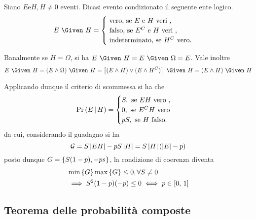 \documentclass{subfiles}
\begin{document}
\begin{Definition*}
    Siano \(E \text{e} H, H \neq 0\) eventi.
    Dicasi evento condizionato il seguente ente logico.
    \[E \Given H = \begin{cases}
            \text{vero, se} E \text{e} H \text{veri},      \\
            \text{falso, se} E^{C} \text{e} H \text{veri}, \\
            \text{indeterminato, se} H^{C} \text{vero.}
        \end{cases}\]
\end{Definition*}

Banalmente se \(H = \Omega\), si ha \(E \Given H = E \Given \Omega = E\).
Vale inoltre
\[
    E \Given H = (E \land \Omega) \Given H = \left[(E \land H) \lor (E \land H^{C})\right] \Given H = (E \land H) \Given H
\]

Applicando dunque il criterio di scommessa si ha che
\[
    \Prob{E}[H] = \begin{cases}
        S, \text{se} EH \text{vero},    \\
        0, \text{se} E^{C}H \text{vero} \\
        pS, \text{se} H \text{falso.}
    \end{cases}\]
da cui, considerando il guadagno si ha
\[
    \mathcal{G} = S \left\vert EH \right\vert - pS\left\vert H \right\vert = S\left\vert H \right\vert (\left\vert E \right\vert - p)
\]
posto dunque \(G = \Set{S(1 - p), -ps}\), la condizione di coerenza diventa
\[\begin{aligned}
         & \Min{G}\Max{G} \le 0, \forall S \neq 0                   \\
         & \implies S^{2}(1 - p)(-p) \le 0 \iff p \in \Range*{0}{1}
    \end{aligned}\]

\subsection{Teorema delle probabilità composte}

\end{document}
